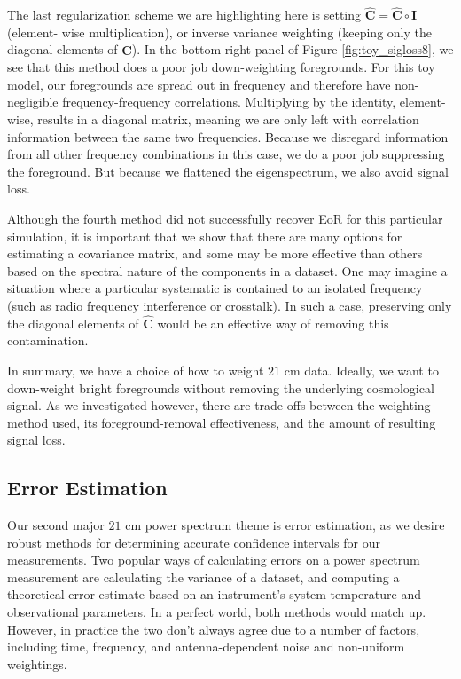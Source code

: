 \documentclass[preprint2,numberedappendix,tighten]{aastex6}  %
\begin{document}
The last regularization scheme we are highlighting here is setting $\hat{\textbf{C}} = \hat{\textbf{C}} \circ \textbf{I}$ (element-
wise multiplication), or inverse variance weighting (keeping only the diagonal elements of $\hat{\textbf{C}}$). In the bottom right 
panel of Figure \ref{fig:toy_sigloss8}, we see that this method does a poor job down-weighting foregrounds. For this toy model, 
our foregrounds are spread out in frequency and therefore have non-negligible frequency-frequency correlations. Multiplying by 
the identity, element-wise, results in a diagonal matrix, meaning we are only left with correlation information between the same 
two frequencies. Because we disregard information from all other frequency combinations in this case, we do a poor job 
suppressing the foreground. But because we flattened the eigenspectrum, we also avoid signal loss. 

Although the fourth method did not successfully recover EoR for this particular simulation, it is important that we show that there 
are many options for estimating a covariance matrix, and some may be more effective than others based on the spectral nature 
of the components in a dataset. One may imagine a situation where a particular systematic is contained to an isolated 
frequency (such as radio frequency interference or crosstalk). In such a case, preserving only the diagonal elements of $
\hat{\textbf{C}}$ would be an effective way of removing this contamination. 

In summary, we have a choice of how to weight $21$ cm data. Ideally, we want to down-weight bright foregrounds without 
removing the underlying cosmological signal. As we investigated however, there are trade-offs between the weighting method 
used, its foreground-removal effectiveness, and the amount of resulting signal loss. 


\subsection{Error Estimation}
\label{sec:ErrorOverview}

Our second major $21$ cm power spectrum theme is error estimation, as we desire robust methods for determining accurate 
confidence intervals for our measurements. Two popular ways of calculating errors on a power spectrum 
measurement are calculating the variance of a dataset, and computing a theoretical error estimate based on an instrument's 
system temperature and observational parameters. In a perfect world, both methods would match up. However, in practice the 
two don't always agree due to a number of factors, including time, frequency, and antenna-dependent noise and non-uniform 
weightings. 
\end{document}
